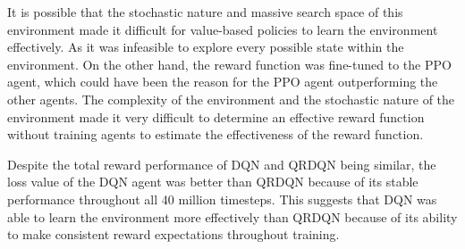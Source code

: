 It is possible that the stochastic nature and massive search space of this environment made it difficult for value-based policies to learn the environment effectively. As it was infeasible to explore every possible state within the environment. On the other hand, the reward function was fine-tuned to the PPO agent, which could have been the reason for the PPO agent outperforming the other agents. The complexity of the environment and the stochastic nature of the environment made it very difficult to determine an effective reward function without training agents to estimate the effectiveness of the reward function. 

Despite the total reward performance of DQN and QRDQN being similar, the loss value of the DQN agent was better than QRDQN because of its stable performance throughout all 40 million timesteps. This suggests that DQN was able to learn the environment more effectively than QRDQN because of its ability to make consistent reward expectations throughout training.
